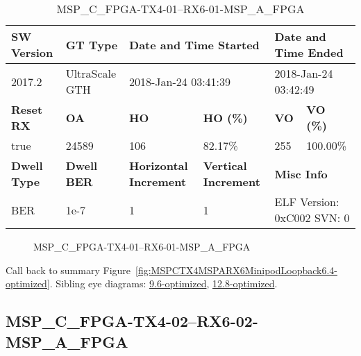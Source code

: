 \begin{table}[h]
\centering
\caption{MSP\_C\_FPGA-TX4-01--RX6-01-MSP\_A\_FPGA}
\label{tab:MSPCFPGATX401RX601MSPAFPGA6.4-optimized}
\begin{tabular}{@{}|l|l|l|l|l|l|@{}}
\toprule
\textbf{SW Version}                & \textbf{GT Type}   & \multicolumn{2}{l|}{\textbf{Date and Time Started}}            & \multicolumn{2}{l|}{\textbf{Date and Time Ended}}        \\ \midrule
2017.2                       & UltraScale GTH          & \multicolumn{2}{l|}{2018-Jan-24 03:41:39}                   & \multicolumn{2}{l|}{2018-Jan-24 03:42:49}               \\ \midrule
\textbf{Reset RX}                  & \textbf{OA} & \textbf{HO}   & \textbf{HO (\%)} & \textbf{VO} & \textbf{VO (\%)} \\ \midrule
true & 24589        & 106          & 82.17\%        & 255        & 100.00\%       \\ \midrule
\textbf{Dwell Type}                & \textbf{Dwell BER} & \textbf{Horizontal Increment} & \textbf{Vertical Increment}    & \multicolumn{2}{l|}{\textbf{Misc Info}}                  \\ \midrule
BER                            & 1e-7        & 1        & 1           & \multicolumn{2}{l|}{ELF Version: 0xC002 SVN: 0}                         \\ \bottomrule
\end{tabular}
\end{table}

\begin{figure}[h]
\caption{MSP\_C\_FPGA-TX4-01--RX6-01-MSP\_A\_FPGA} \label{fig:MSPCFPGATX401RX601MSPAFPGA6.4-optimized}
\end{figure}

Call back to summary Figure~\ref{fig:MSPCTX4MSPARX6MinipodLoopback6.4-optimized}.
Sibling eye diagrams: \hyperref[sec:MSPCFPGATX401RX601MSPAFPGA9.6-optimized]{9.6-optimized}, \hyperref[sec:MSPCFPGATX401RX601MSPAFPGA12.8-optimized]{12.8-optimized}.

\clearpage
\newpage


\subsection{MSP\_C\_FPGA-TX4-02--RX6-02-MSP\_A\_FPGA}\label{sec:MSPCFPGATX402RX602MSPAFPGA6.4-optimized}

